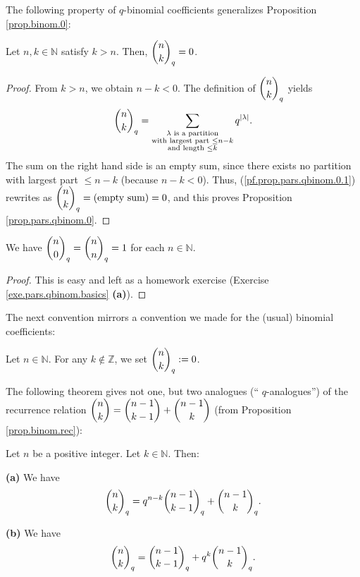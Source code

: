 The following property of $q$-binomial coefficients generalizes Proposition
\ref{prop.binom.0}:

\begin{proposition}
\label{prop.pars.qbinom.0}Let $n,k\in\mathbb{N}$ satisfy $k>n$. Then,
$\dbinom{n}{k}_{q}=0$.
\end{proposition}

\begin{proof}
From $k>n$, we obtain $n-k<0$. The definition of $\dbinom{n}{k}_{q}$ yields%
\begin{equation}
\dbinom{n}{k}_{q}=\sum_{\substack{\lambda\text{ is a partition}\\\text{with
largest part }\leq n-k\\\text{and length }\leq k}}q^{\left\vert \lambda
\right\vert }. \label{pf.prop.pars.qbinom.0.1}%
\end{equation}
The sum on the right hand side is an empty sum, since there exists no
partition with largest part $\leq n-k$ (because $n-k<0$). Thus,
(\ref{pf.prop.pars.qbinom.0.1}) rewrites as $\dbinom{n}{k}_{q}=\left(
\text{empty sum}\right)  =0$, and this proves Proposition
\ref{prop.pars.qbinom.0}.
\end{proof}

\begin{proposition}
\label{prop.pars.qbinom.n0}We have $\dbinom{n}{0}_{q}=\dbinom{n}{n}_{q}=1$ for
each $n\in\mathbb{N}$.
\end{proposition}

\begin{proof}
This is easy and left as a homework exercise (Exercise
\ref{exe.pars.qbinom.basics} \textbf{(a)}).
\end{proof}

The next convention mirrors a convention we made for the (usual) binomial coefficients:

\begin{convention}
\label{conv.pars.qbinom.neg-k}Let $n\in\mathbb{N}$. For any $k\notin%
\mathbb{Z}$, we set $\dbinom{n}{k}_{q}:=0$.
\end{convention}

The following theorem gives not one, but two analogues (\textquotedblleft%
$q$-analogues\textquotedblright) of the recurrence relation $\dbinom{n}%
{k}=\dbinom{n-1}{k-1}+\dbinom{n-1}{k}$ (from Proposition \ref{prop.binom.rec}):

\begin{theorem}
\label{thm.pars.qbinom.rec}Let $n$ be a positive integer. Let $k\in\mathbb{N}%
$. Then: \medskip

\textbf{(a)} We have%
\[
\dbinom{n}{k}_{q}=q^{n-k}\dbinom{n-1}{k-1}_{q}+\dbinom{n-1}{k}_{q}.
\]


\textbf{(b)} We have%
\[
\dbinom{n}{k}_{q}=\dbinom{n-1}{k-1}_{q}+q^{k}\dbinom{n-1}{k}_{q}.
\]

\end{theorem}

